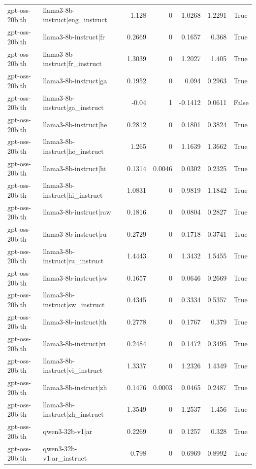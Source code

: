 \begin{table}
\begin{tabular}{l l r r r r l}
gpt-oss-20b|th & llama3-8b-instruct|eng_instruct & 1.128 & 0 & 1.0268 & 1.2291 & True \\
gpt-oss-20b|th & llama3-8b-instruct|fr & 0.2669 & 0 & 0.1657 & 0.368 & True \\
gpt-oss-20b|th & llama3-8b-instruct|fr_instruct & 1.3039 & 0 & 1.2027 & 1.405 & True \\
gpt-oss-20b|th & llama3-8b-instruct|ga & 0.1952 & 0 & 0.094 & 0.2963 & True \\
gpt-oss-20b|th & llama3-8b-instruct|ga_instruct & -0.04 & 1 & -0.1412 & 0.0611 & False \\
gpt-oss-20b|th & llama3-8b-instruct|he & 0.2812 & 0 & 0.1801 & 0.3824 & True \\
gpt-oss-20b|th & llama3-8b-instruct|he_instruct & 1.265 & 0 & 1.1639 & 1.3662 & True \\
gpt-oss-20b|th & llama3-8b-instruct|hi & 0.1314 & 0.0046 & 0.0302 & 0.2325 & True \\
gpt-oss-20b|th & llama3-8b-instruct|hi_instruct & 1.0831 & 0 & 0.9819 & 1.1842 & True \\
gpt-oss-20b|th & llama3-8b-instruct|raw & 0.1816 & 0 & 0.0804 & 0.2827 & True \\
gpt-oss-20b|th & llama3-8b-instruct|ru & 0.2729 & 0 & 0.1718 & 0.3741 & True \\
gpt-oss-20b|th & llama3-8b-instruct|ru_instruct & 1.4443 & 0 & 1.3432 & 1.5455 & True \\
gpt-oss-20b|th & llama3-8b-instruct|sw & 0.1657 & 0 & 0.0646 & 0.2669 & True \\
gpt-oss-20b|th & llama3-8b-instruct|sw_instruct & 0.4345 & 0 & 0.3334 & 0.5357 & True \\
gpt-oss-20b|th & llama3-8b-instruct|th & 0.2778 & 0 & 0.1767 & 0.379 & True \\
gpt-oss-20b|th & llama3-8b-instruct|vi & 0.2484 & 0 & 0.1472 & 0.3495 & True \\
gpt-oss-20b|th & llama3-8b-instruct|vi_instruct & 1.3337 & 0 & 1.2326 & 1.4349 & True \\
gpt-oss-20b|th & llama3-8b-instruct|zh & 0.1476 & 0.0003 & 0.0465 & 0.2487 & True \\
gpt-oss-20b|th & llama3-8b-instruct|zh_instruct & 1.3549 & 0 & 1.2537 & 1.456 & True \\
gpt-oss-20b|th & qwen3-32b-v1|ar & 0.2269 & 0 & 0.1257 & 0.328 & True \\
gpt-oss-20b|th & qwen3-32b-v1|ar_instruct & 0.798 & 0 & 0.6969 & 0.8992 & True \\

\end{tabular}
\end{table}
